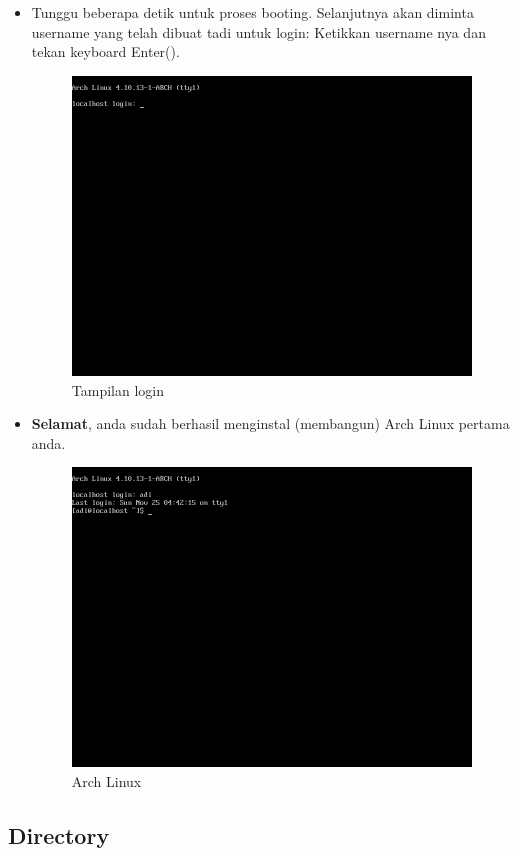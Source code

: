 \documentclass[12pt,]{article}
\begin{document}
\begin{itemize}
		\item Tunggu beberapa detik untuk proses booting.
		Selanjutnya akan diminta username yang telah dibuat tadi untuk login:
		Ketikkan username nya dan tekan keyboard Enter(\keys{\return}).
		\begin{figure}[H]
			\centering
			\includegraphics[width=0.4\linewidth]{images/vbox_afterinstall/s4}
			\caption{Tampilan login}
		\end{figure}
	
		\item \textbf{Selamat}, anda sudah berhasil menginstal (membangun) Arch Linux pertama anda.
		\begin{figure}[H]
			\centering
			\includegraphics[width=0.4\linewidth]{images/vbox_afterinstall/s5}
			\caption{Arch Linux}
		\end{figure}
	\end{itemize} 

	\subsection{Directory}	
	
\end{document}
